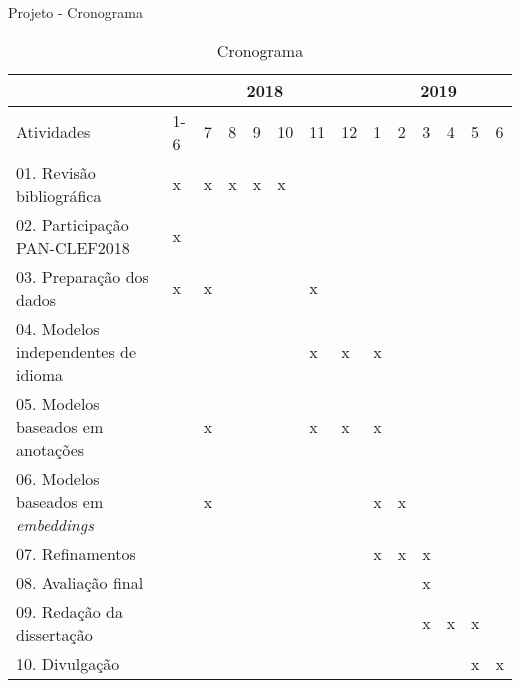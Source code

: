 \begin{frame}{Projeto - Cronograma}


\setlength{\tabcolsep}{4pt}\selectFont
\begin{table}[]
	\centering
	\caption{Cronograma}
		\begin{tabular}{|l|l|l|l|l|l|l|l|l|l|l|l|l|l|}
			\toprule
			                                         & \multicolumn{7}{c|}{2018}      & \multicolumn{6}{c|}{2019} \\ \midrule
			Atividades                               & 1-6 & 7 & 8 & 9 & 10 & 11 & 12 & 1 & 2 & 3 & 4 & 5 & 6     \\ \hline
			01. Revisão bibliográfica                & x   & x & x & x & x  &    &    &   &   &   &   &   &       \\ \hline
			02. Participação PAN-CLEF2018            & x   &   &   &   &    &    &    &   &   &   &   &   &       \\ \hline
			03. Preparação dos dados                 & x   & x &   &   &    & x  &    &   &   &   &   &   &       \\ \hline
			04. Modelos independentes de idioma      &     &   &   &   &    & x  & x  & x &   &   &   &   &       \\ \hline
			05. Modelos baseados em anotações        &     & x &   &   &    & x  & x  & x &   &   &   &   &       \\ \hline
			06. Modelos baseados em {\it embeddings} &     & x &   &   &    &    &    & x & x &   &   &   &       \\ \hline
			07. Refinamentos                         &     &   &   &   &    &    &    & x & x & x &   &   &       \\ \hline
			08. Avaliação final                      &     &   &   &   &    &    &    &   &   & x &   &   &       \\ \hline
			09. Redação da dissertação               &     &   &   &   &    &    &    &   &   & x & x & x &       \\ \hline
			10. Divulgação                           &     &   &   &   &    &    &    &   &   &   &   & x & x     \\ \bottomrule
		\end{tabular}
	\end{table}
\end{frame}




